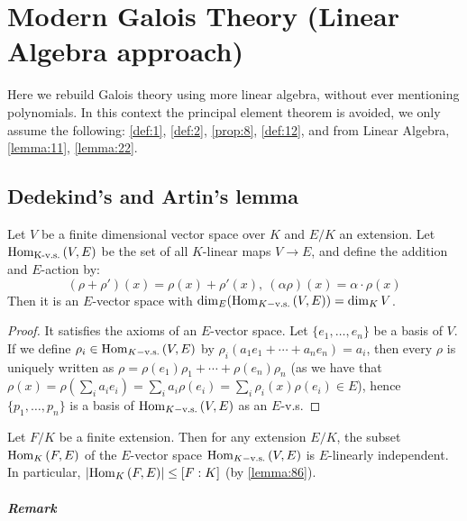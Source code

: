 
\chapter{Modern Galois Theory (Linear Algebra approach)}
\label{chap:3}

Here we rebuild Galois theory using more linear algebra, without ever mentioning polynomials. In this context the principal element theorem is avoided, we only assume the following: \autoref{def:1}, \autoref{def:2}, \autoref{prop:8}, \autoref{def:12}, and from Linear Algebra, \autoref{lemma:11}, \autoref{lemma:22}.

\section{Dedekind's and Artin's lemma}
\label{sec:3.1}

\begin{lemma}
  \label{lemma:86}
  Let $V$ be a finite dimensional vector space over $K$ and $E/K$ an extension. Let $\homset[\text{K-v.s.}]{V}{E}$ be the set of all $K$-linear maps $V \rightarrow E$, and define the addition and $E$-action by:
\[
(\rho + \rho')(x) = \rho(x) + \rho'(x), \ (\alpha\rho)(x)=\alpha\cdot{}\rho(x)
\]
Then it is an $E$-vector space with $\dim_E (\homset[K-\text{v.s.}]{V}{E}) = \dim_K V$.
\end{lemma}

\begin{proof}
  It satisfies the axioms of an $E$-vector space. Let $\{ e_1, \ldots, e_n \}$ be a basis of $V$. If we define $\rho_i \in \homset[K-\text{v.s.}]{V}{E}$ by $\rho_i(a_1e_1 + \cdots{} + a_ne_n) = a_i$, then every $\rho$ is uniquely written as $\rho = \rho(e_1)\rho_1 + \cdots{} + \rho(e_n)\rho_n$ (as we have that $\rho(x) = \rho(\sum_i a_ie_i) = \sum_i a_i\rho(e_i) = \sum_i \rho_i(x)\rho(e_i) \in E$), hence $\{ p_1, \ldots, p_n \}$ is a basis of $\homset[K-\text{v.s.}]{V}{E}$ as an $E$-v.s.
\end{proof}

\begin{proposition}
  \label{prop:87}
  Let $F/K$ be a finite extension. Then for any extension $E/K$, the subset $\homset{F}{E}$ of the $E$-vector space $\homset[K-\text{v.s.}]{V}{E}$ is $E$-linearly independent. In particular, $\card{\homset{F}{E}} \leq [F : K]$ (by \autoref{lemma:86}).
\end{proposition}

\paragraph{Remark}

